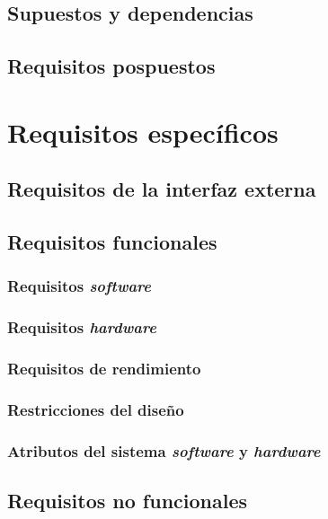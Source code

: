 \section{Supuestos y dependencias}


\section{Requisitos pospuestos}


\newpage


\chapter{Requisitos específicos}
\label{Requisitos específicos}


\section{Requisitos de la interfaz externa}




\section{Requisitos funcionales}
\subsection{Requisitos \textit{software}}




\subsection{Requisitos \textit{hardware}}


\subsection{Requisitos de rendimiento}


\subsection{Restricciones del diseño}


\subsection{Atributos del sistema \textit{software} y \textit{hardware}}


\section{Requisitos no funcionales}


\appendix

